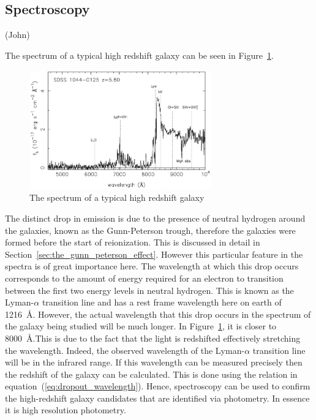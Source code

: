 \subsection{Spectroscopy} %
\label{sec:spectroscopy}
(John)

	The spectrum of a typical high redshift galaxy can be seen in Figure~\ref{fig:high_redshift_galaxy_spectrum}.
	\begin{figure}[htbp]
		\centering
			\includegraphics[width=0.7\textwidth]{../Images/high_redshift_galaxy_spec.jpg}
		\caption{\label{fig:high_redshift_galaxy_spectrum} The spectrum of a typical high redshift galaxy}
	\end{figure}

	The distinct drop in emission is due to the presence of neutral hydrogen around the galaxies, known as the Gunn-Peterson trough, therefore the galaxies were formed before the start of reionization. This is discussed in detail in Section~\ref{sec:the_gunn_peterson_effect}. However this particular feature in the spectra is of great importance here. The wavelength at which this drop occurs corresponds to the amount of energy required for an electron to transition between the first two energy levels in neutral hydrogen. This is known as the Lyman-$\alpha$ transition line and has a rest frame wavelength here on earth of \SI{1216}{\angstrom}\cite{LymanAlphaForest}\cite{TransofAtomicH}. However, the actual wavelength that this drop occurs in the spectrum of the galaxy being studied will be much longer. In Figure~\ref{fig:high_redshift_galaxy_spectrum}, it is closer to \SI{8000}{\angstrom}.This is due to the fact that the light is redshifted effectively stretching the wavelength. Indeed, the observed wavelength of the Lyman-$\alpha$ transition line will be in the infrared range. If this wavelength can be measured precisely then the redshift of the galaxy can be calculated\cite{EvidenceRion}. This is done using the relation in equation~(\ref{eq:dropout_wavelength}). Hence, spectroscopy can be used to confirm the high-redshift galaxy candidates that are identified via photometry. In essence it is high resolution photometry.

